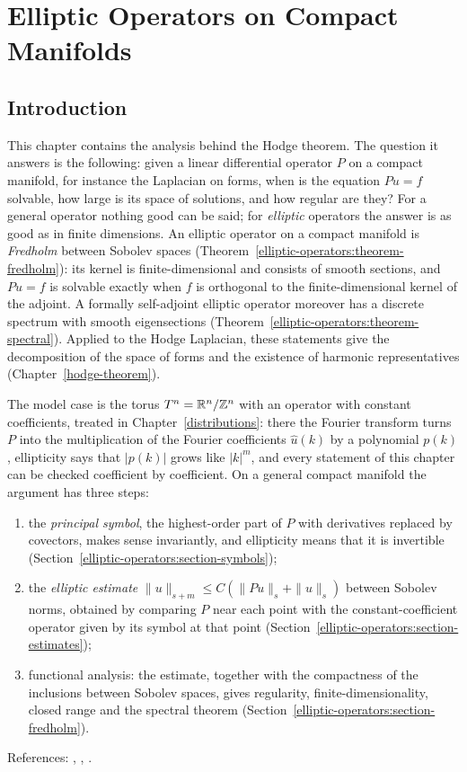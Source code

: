 \chapter{Elliptic Operators on Compact Manifolds}\label{elliptic-operators}

\section{Introduction}\label{elliptic-operators:section-introduction}

This chapter contains the analysis behind the Hodge theorem. The question it answers is the following: given a linear differential operator $P$ on a compact manifold, for instance the
Laplacian on forms, when is the equation $Pu = f$ solvable, how large is its space of solutions, and how regular are they? For a general operator nothing good can be said; for
\emph{elliptic} operators the answer is as good as in finite dimensions. An elliptic operator on a compact manifold is \emph{Fredholm} between Sobolev spaces
(Theorem~\ref{elliptic-operators:theorem-fredholm}): its kernel is finite-dimensional and consists of smooth sections, and $Pu = f$ is solvable exactly when $f$ is orthogonal to the
finite-dimensional kernel of the adjoint. A formally self-adjoint elliptic operator moreover has a discrete spectrum with smooth eigensections
(Theorem~\ref{elliptic-operators:theorem-spectral}). Applied to the Hodge Laplacian, these statements give the decomposition of the space of forms and the existence of harmonic representatives
(Chapter~\ref{hodge-theorem}).

The model case is the torus $T^n = \mathbb{R}^n/\mathbb{Z}^n$ with an operator with constant coefficients, treated in Chapter~\ref{distributions}: there the Fourier transform turns $P$ into the multiplication of
the Fourier coefficients $\hat u(k)$ by a polynomial $p(k)$, ellipticity says that $|p(k)|$ grows like $|k|^m$, and every statement of this chapter can be checked coefficient by coefficient. On a
general compact manifold the argument has three steps:
\begin{enumerate}
\item the \emph{principal symbol}, the highest-order part of $P$ with derivatives replaced by covectors, makes sense invariantly, and ellipticity means that it is invertible
(Section~\ref{elliptic-operators:section-symbols});
\item the \emph{elliptic estimate} $\|u\|_{s+m} \leq C(\|Pu\|_s + \|u\|_s)$ between Sobolev norms, obtained by comparing $P$ near each point with the constant-coefficient operator given by its
symbol at that point (Section~\ref{elliptic-operators:section-estimates});
\item functional analysis: the estimate, together with the compactness of the inclusions between Sobolev spaces, gives regularity, finite-dimensionality, closed range and the spectral theorem
(Section~\ref{elliptic-operators:section-fredholm}).
\end{enumerate}
References: \cite[Chapter 6]{warner-foundations}, \cite[Chapter 4]{wells-differential-analysis}, \cite{hormander-pdo1}.

